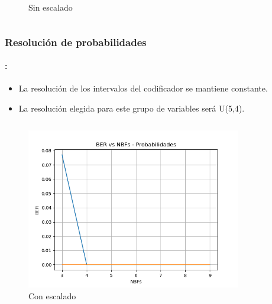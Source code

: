 \begin{frame}
\begin{columns}
\begin{column}{0.48\paperwidth}
\begin{figure}
    \caption{Sin escalado}
    \end{figure}
    \end{column}
\end{columns}
    \end{frame}

\begin{frame}
  \frametitle{\textbf{Resolución de probabilidades}}
\framesubtitle{\secname : \subsecname}
    \begin{block}{}
    \begin{itemize}
    \item  La resolución de los intervalos del codificador se mantiene constante.
    \item  La resolución elegida para este grupo de variables será U(5,4).
    \end{itemize}
    \end{block}
       \vspace{-0.3cm}
    \begin{columns}
    \begin{column}{0.48\paperwidth}
     \begin{figure}
     \centering
    \includegraphics[width=\textwidth]{Graficos/cuantization2.png}%
    \caption{Con escalado}
    \end{figure}
    \end{column}
    \begin{column}{0.48\paperwidth}  
    \begin{figure}
    \centering

\end{figure}
\end{column}
\end{columns}
\end{frame}
